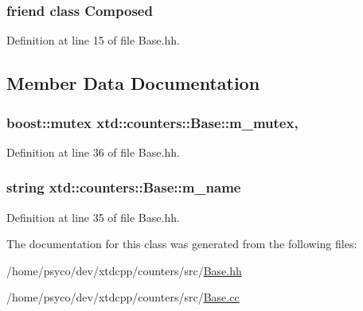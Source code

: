 \subsubsection[{\texorpdfstring{Composed}{Composed}}]{\setlength{\rightskip}{0pt plus 5cm}friend class {\bf Composed}\hspace{0.3cm}{\ttfamily [friend]}}\hypertarget{classxtd_1_1counters_1_1Base_a93e934ad70d5b32b14beed5572450abf}{}\label{classxtd_1_1counters_1_1Base_a93e934ad70d5b32b14beed5572450abf}


Definition at line 15 of file Base.\+hh.



\subsection{Member Data Documentation}
\subsubsection[{\texorpdfstring{m\+\_\+mutex}{m_mutex}}]{\setlength{\rightskip}{0pt plus 5cm}boost\+::mutex xtd\+::counters\+::\+Base\+::m\+\_\+mutex\hspace{0.3cm}{\ttfamily [mutable]}, {\ttfamily [protected]}}\hypertarget{classxtd_1_1counters_1_1Base_aeeac2ffcae02eb6341418d708188a353}{}\label{classxtd_1_1counters_1_1Base_aeeac2ffcae02eb6341418d708188a353}


Definition at line 36 of file Base.\+hh.

\subsubsection[{\texorpdfstring{m\+\_\+name}{m_name}}]{\setlength{\rightskip}{0pt plus 5cm}string xtd\+::counters\+::\+Base\+::m\+\_\+name\hspace{0.3cm}{\ttfamily [protected]}}\hypertarget{classxtd_1_1counters_1_1Base_ab07d4a6071bfa8263b24d5992bca6960}{}\label{classxtd_1_1counters_1_1Base_ab07d4a6071bfa8263b24d5992bca6960}


Definition at line 35 of file Base.\+hh.



The documentation for this class was generated from the following files\+:\begin{DoxyCompactItemize}
\item 
/home/psyco/dev/xtdcpp/counters/src/\hyperlink{Base_8hh}{Base.\+hh}\item 
/home/psyco/dev/xtdcpp/counters/src/\hyperlink{Base_8cc}{Base.\+cc}\end{DoxyCompactItemize}
